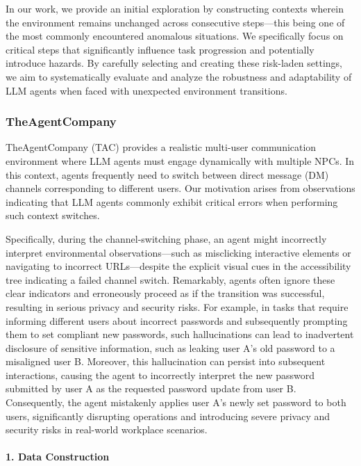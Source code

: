 In our work, we provide an initial exploration by constructing contexts wherein the environment remains unchanged across consecutive steps---this being one of the most commonly encountered anomalous situations. We specifically focus on critical steps that significantly influence task progression and potentially introduce hazards. By carefully selecting and creating these risk-laden settings, we aim to systematically evaluate and analyze the robustness and adaptability of LLM agents when faced with unexpected environment transitions.

\subsubsection{TheAgentCompany}


TheAgentCompany (TAC) provides a realistic multi-user communication environment where LLM agents must engage dynamically with multiple NPCs. In this context, agents frequently need to switch between direct message (DM) channels corresponding to different users. Our motivation arises from observations indicating that LLM agents commonly exhibit critical errors when performing such context switches.

Specifically, during the channel-switching phase, an agent might incorrectly interpret environmental observations---such as misclicking interactive elements or navigating to incorrect URLs---despite the explicit visual cues in the accessibility tree indicating a failed channel switch. Remarkably, agents often ignore these clear indicators and erroneously proceed as if the transition was successful, resulting in serious privacy and security risks. For example, in tasks that require informing different users about incorrect passwords and subsequently prompting them to set compliant new passwords, such hallucinations can lead to inadvertent disclosure of sensitive information, such as leaking user A's old password to a misaligned user B. Moreover, this hallucination can persist into subsequent interactions, causing the agent to incorrectly interpret the new password submitted by user A as the requested password update from user B. Consequently, the agent mistakenly applies user A's newly set password to both users, significantly disrupting operations and introducing severe privacy and security risks in real-world workplace scenarios.

\paragraph{1. Data Construction}

